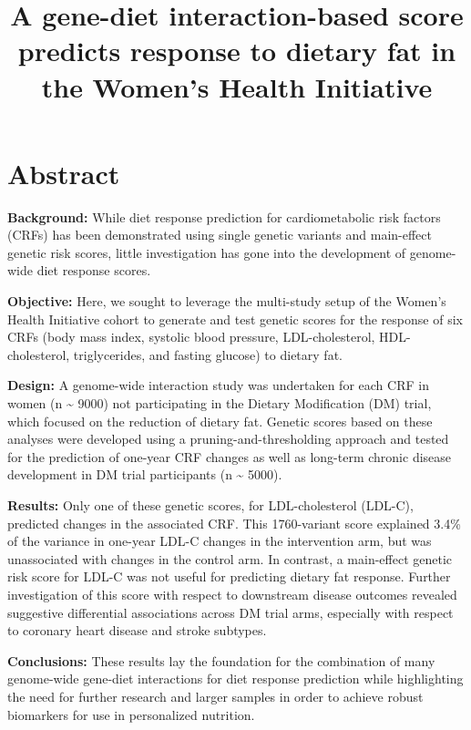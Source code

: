 \documentclass[]{article}
\title{A gene-diet interaction-based score predicts response to dietary fat in
the Women's Health Initiative}
\author{}
\date{}
\begin{document}
\maketitle

\hypertarget{abstract}{%
\section{Abstract}\label{abstract}}

\textbf{Background:} While diet response prediction for cardiometabolic
risk factors (CRFs) has been demonstrated using single genetic variants
and main-effect genetic risk scores, little investigation has gone into
the development of genome-wide diet response scores.

\textbf{Objective:} Here, we sought to leverage the multi-study setup of
the Women's Health Initiative cohort to generate and test genetic scores
for the response of six CRFs (body mass index, systolic blood pressure,
LDL-cholesterol, HDL-cholesterol, triglycerides, and fasting glucose) to
dietary fat.

\textbf{Design:} A genome-wide interaction study was undertaken for each
CRF in women (n \textasciitilde{} 9000) not participating in the Dietary
Modification (DM) trial, which focused on the reduction of dietary fat.
Genetic scores based on these analyses were developed using a
pruning-and-thresholding approach and tested for the prediction of
one-year CRF changes as well as long-term chronic disease development in
DM trial participants (n \textasciitilde{} 5000).

\textbf{Results:} Only one of these genetic scores, for LDL-cholesterol
(LDL-C), predicted changes in the associated CRF. This 1760-variant
score explained 3.4\% of the variance in one-year LDL-C changes in the
intervention arm, but was unassociated with changes in the control arm.
In contrast, a main-effect genetic risk score for LDL-C was not useful
for predicting dietary fat response. Further investigation of this score
with respect to downstream disease outcomes revealed suggestive
differential associations across DM trial arms, especially with respect
to coronary heart disease and stroke subtypes.

\textbf{Conclusions:} These results lay the foundation for the
combination of many genome-wide gene-diet interactions for diet response
prediction while highlighting the need for further research and larger
samples in order to achieve robust biomarkers for use in personalized
nutrition.
\end{document}
